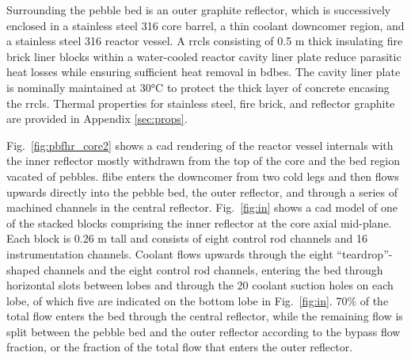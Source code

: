 Surrounding the pebble bed is an outer graphite reflector, which is successively enclosed in a stainless steel 316 core barrel, a thin coolant downcomer region, and a stainless steel 316 reactor vessel. A \gls{rrcls} consisting of 0.5 \si{\meter} thick insulating fire brick liner blocks within a water-cooled reactor cavity liner plate reduce parasitic heat losses while ensuring sufficient heat removal in \glspl{bdbe}. The cavity liner plate is nominally maintained at 30\si{\celsius} to protect the thick layer of concrete encasing the \gls{rrcls}. Thermal properties for stainless steel, fire brick, and reflector graphite are provided in Appendix \ref{sec:props}.

Fig.\ \ref{fig:pbfhr_core2} shows a \gls{cad} rendering of the reactor vessel internals with the inner reflector mostly withdrawn from the top of the core and the bed region vacated of pebbles. \gls{flibe} enters the downcomer from two cold legs and then flows upwards directly into the pebble bed, the outer reflector, and through a series of machined channels in the central reflector. Fig.\ \ref{fig:in} shows a \gls{cad} model of one of the stacked blocks comprising the inner reflector at the core axial mid-plane. Each block is 0.26 \si{\meter} tall and consists of eight control rod channels and 16 instrumentation channels. Coolant flows upwards through the eight ``teardrop''-shaped channels and the eight control rod channels, entering the bed through horizontal slots between lobes and through the 20 coolant suction holes on each lobe, of which five are indicated on the bottom lobe in Fig.\ \ref{fig:in}. 70\% of the total flow enters the bed through the central reflector, while the remaining flow is split between the pebble bed and the outer reflector according to the bypass flow fraction, or the fraction of the total flow that enters the outer reflector. 

